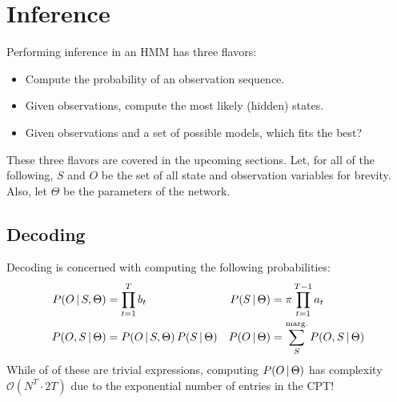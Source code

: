 	\section{Inference}
		Performing inference in an HMM has three flavors:
		\begin{itemize}
			\item {}             Compute the probability of an observation sequence.
			\item {}  Given observations, compute the most likely (hidden) states.
			\item {} Given observations and a set of possible models, which fits the best?
		\end{itemize}
		These three flavors are covered in the upcoming sections. Let, for all of the following, \(S\) and \(O\) be the set of all state and observation variables for brevity. Also, let \(\Theta\) be the parameters of the network.

		\subsection{Decoding}
			Decoding is concerned with computing the following probabilities:
			\begin{align}
				P(O \,\vert\, S, \Theta) & = \prod_{t = 1}^{T} b_t                       &
				P(S \,\vert\, \Theta)    & = \pi \prod_{t = 1}^{T - 1} a_t                 \\
				P(O, S \,\vert\, \Theta) & = P(O \,\vert\, S, \Theta) \, P(S \,\vert\, \Theta) &
				P(O \,\vert\, \Theta)    & = \sum_{S}^{\operatorname{marg.}} P(O, S \,\vert\, \Theta)
			\end{align}
			While of of these are trivial expressions, computing \( P(O \,\vert\, \Theta) \) has complexity \( \mathcal{O}(N^T \cdot 2T) \) due to the exponential number of entries in the CPT!

